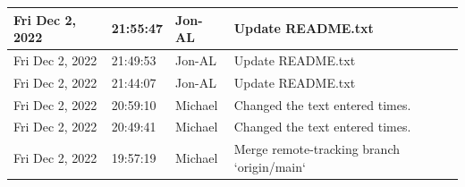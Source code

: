 \documentclass[11pt]{article}
\begin{document}
\begin{center}
\begin{longtable}{|p{2.7cm}|l|p{2cm}|p{8cm}|}
           \hline Fri Dec 2, 2022                            & 21:55:47                           & Jon-AL                                  & Update README.txt                                                                                                                                                                                                                                                                                          \\
           \hline Fri Dec 2, 2022                            & 21:49:53                           & Jon-AL                                  & Update README.txt                                                                                                                                                                                                                                                                                          \\
           \hline Fri Dec 2, 2022                            & 21:44:07                           & Jon-AL                                  & Update README.txt                                                                                                                                                                                                                                                                                          \\
           \hline Fri Dec 2, 2022                            & 20:59:10                           & Michael                                 & Changed the text entered times.                                                                                                                                                                                                                                                                            \\
           \hline Fri Dec 2, 2022                            & 20:49:41                           & Michael                                 & Changed the text entered times.                                                                                                                                                                                                                                                                            \\
           \hline Fri Dec 2, 2022                            & 19:57:19                           & Michael                                 & Merge remote-tracking branch `origin/main`                                                                                                                                                                                                                                                                 \\

\end{longtable}
\end{center}
\end{document}
